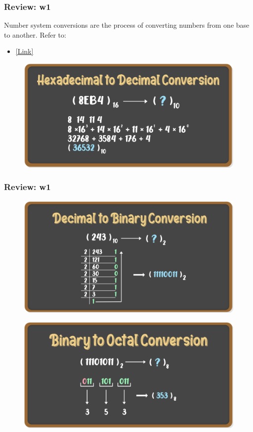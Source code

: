 \documentclass[
	11pt, %
]{beamer}
\begin{document}

\begin{frame}
	\frametitle{Review: w1}
Number system conversions are the process of converting numbers from one base to another. Refer to:
\begin{itemize}
    \item \href{https://www.geeksforgeeks.org/number-system-in-maths/}{[Link]}
\end{itemize}


	\begin{figure}
		\includegraphics[width=0.8\linewidth]{hextodec.png}
	\end{figure}



\end{frame}


\begin{frame}
	\frametitle{Review: w1}

	\begin{figure}
		\includegraphics[width=0.6\linewidth]{dectobin.png}
	\end{figure}

	\begin{figure}
		\includegraphics[width=0.6\linewidth]{bintooct.png}
	\end{figure}




\end{frame}
\end{document}

